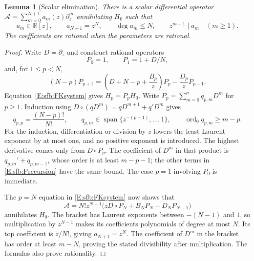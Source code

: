 \documentclass[11pt,a4paper]{article}
\newtheorem{lemma}[theorem]{Lemma}
\theoremstyle{definition}
\theoremstyle{remark}
\numberwithin{equation}{section}
\begin{document}
\begin{lemma}[Scalar elimination]\label{E:sfb:elimination}
There is a scalar differential operator
$\mathcal A=\sum_{m=0}^{N+1}a_m(z)\partial_z^m$ annihilating $H_0$ such that
\[
 a_m\in\mathbb R[z],\qquad a_{N+1}=z^N,\qquad
 \deg a_m\le N,\qquad z^{m-1}\mid a_m\quad(m\ge1).
\]
The coefficients are rational when the parameters are rational.
\end{lemma}
\begin{proof}
Write $D=\partial_z$ and construct rational operators
\[
 P_0=1,\qquad P_1=1+D/N,
\]
and, for $1\le p<N$,
\begin{equation}\label{E:sfb:Precursion}
 (N-p)P_{p+1}=
 \left(D+N-p+\frac{B_p}{z}\right)P_p
       -\frac{D_p}{z}P_{p-1}.
\end{equation}
Equation~\eqref{E:sfb:FKsystem} gives $H_p=P_pH_0$.
Write $P_p=\sum_{m=0}^pq_{p,m}D^m$ for $p\ge1$.
Induction using $D\circ(qD^m)=qD^{m+1}+q'D^m$ gives
\[
 q_{p,p}=\frac{(N-p)!}{N!},\qquad
 q_{p,m}\in\operatorname{span}\{z^{-(p-1)},\ldots,1\},
 \qquad \operatorname{ord}_0q_{p,m}\ge m-p.
\]
For the induction, differentiation or division by $z$ lowers
the least Laurent exponent by at most one, and no positive
exponent is introduced.  The highest derivative comes only
from $D\circ P_p$.  The coefficient of $D^m$ in that product
is $q_{p,m}'+q_{p,m-1}$, whose order is at least $m-p-1$;
the other terms in \eqref{E:sfb:Precursion} have the same bound.
The case $p=1$ involving $P_0$ is immediate.

The $p=N$ equation in \eqref{E:sfb:FKsystem} now shows that
\begin{equation}\label{E:sfb:Aoperator}
 \mathcal A=N!z^{N-1}
       \bigl(zD\circ P_N+B_NP_N-D_NP_{N-1}\bigr)
\end{equation}
annihilates $H_0$.  The bracket has Laurent exponents between
$-(N-1)$ and $1$, so multiplication by $z^{N-1}$ makes its
coefficients polynomials of degree at most $N$.
Its top coefficient is $z/N!$, giving $a_{N+1}=z^N$.
The coefficient of $D^m$ in the bracket has order at least
$m-N$, proving the stated divisibility after multiplication.
The formulas also prove rationality.
\end{proof}
\end{document}
